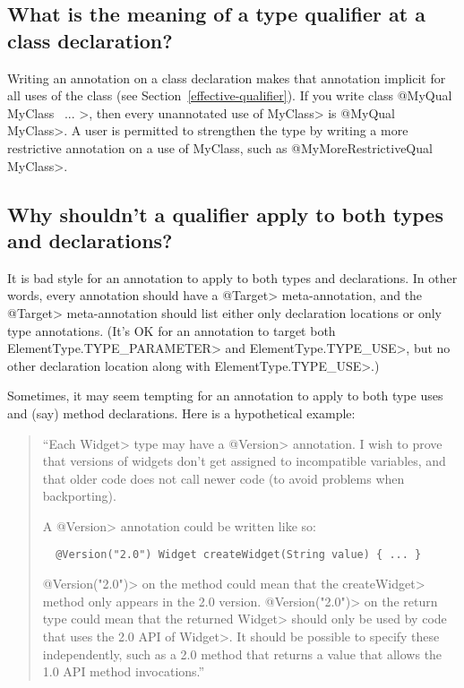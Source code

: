 \subsection{What is the meaning of a type qualifier at a class declaration?\label{faq-type-qualifier-on-class-declaration}}


Writing an annotation on a class declaration makes that annotation implicit
for all uses of the class (see Section~\ref{effective-qualifier}).  If you
write \<class @MyQual MyClass \ttlcb\ ... \ttrcb>, then every unannotated
use of \<MyClass> is \<@MyQual MyClass>.  A user is permitted to strengthen
the type by writing a more restrictive annotation on a use of MyClass, such
as \<@MyMoreRestrictiveQual MyClass>.


\subsection{Why shouldn't a qualifier apply to both types and declarations?\label{faq-no-annotation-on-types-and-declarations}}

It is bad style for an annotation to apply to both types and declarations.
In other words, every annotation should have a \<@Target> meta-annotation,
and the \<@Target> meta-annotation should list either only declaration
locations or only type annotations.  (It's OK for an annotation to target
both \<ElementType.TYPE\_PARAMETER> and \<ElementType.TYPE\_USE>, but no
other declaration location along with \<ElementType.TYPE\_USE>.)

Sometimes, it may seem tempting for an annotation to apply to both type
uses and (say) method declarations.  Here is a hypothetical example:

\begin{quote}
  ``Each \<Widget> type may have a \<@Version> annotation.
  I wish to prove that versions of widgets don't get assigned to
  incompatible variables, and that older code does not call newer code (to
  avoid problems when backporting).

  A \<@Version> annotation could be written like so:

\begin{Verbatim}
  @Version("2.0") Widget createWidget(String value) { ... }
\end{Verbatim}

\<@Version("2.0")> on the method could mean that the \<createWidget> method
only appears in the 2.0 version.  \<@Version("2.0")> on the return type
could mean that the returned \<Widget> should only be used by code that
uses the 2.0 API of \<Widget>.  It should be possible to specify these
independently, such as a 2.0 method that returns a value that allows the
1.0 API method invocations.''
\end{quote}

